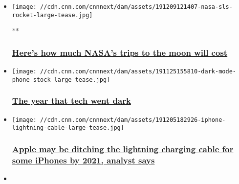 \begin{itemize}
\item
  \href{/videos/business/2019/12/09/nasa-jim-bridenstine-artemis-orig.cnn-business}{}

  \texttt{[image: //cdn.cnn.com/cnnnext/dam/assets/191209121407-nasa-sls-rocket-large-tease.jpg]}

  **

  \hypertarget{heres-how-much-nasas-trips-to-the-moon-will-cost}{%
  \subsubsection{\texorpdfstring{\href{/videos/business/2019/12/09/nasa-jim-bridenstine-artemis-orig.cnn-business}{Here's
  how much NASA's trips to the moon will
  cost}}{Here's how much NASA's trips to the moon will cost}}\label{heres-how-much-nasas-trips-to-the-moon-will-cost}}
\item
  \href{/2019/12/09/tech/dark-mode-design-trend/index.html}{}

  \texttt{[image: //cdn.cnn.com/cnnnext/dam/assets/191125155810-dark-mode-phone--stock-large-tease.jpg]}

  \hypertarget{the-year-that-tech-went-dark}{%
  \subsubsection{\texorpdfstring{\href{/2019/12/09/tech/dark-mode-design-trend/index.html}{The
  year that tech went
  dark}}{The year that tech went dark}}\label{the-year-that-tech-went-dark}}
\item
  \href{/2019/12/08/tech/apple-iphone-lightning-cable/index.html}{}

  \texttt{[image: //cdn.cnn.com/cnnnext/dam/assets/191205182926-iphone-lightning-cable-large-tease.jpg]}

  \hypertarget{apple-may-be-ditching-the-lightning-charging-cable-for-some-iphones-by-2021-analyst-says}{%
  \subsubsection{\texorpdfstring{\href{/2019/12/08/tech/apple-iphone-lightning-cable/index.html}{Apple
  may be ditching the lightning charging cable for some iPhones by 2021,
  analyst
  says}}{Apple may be ditching the lightning charging cable for some iPhones by 2021, analyst says}}\label{apple-may-be-ditching-the-lightning-charging-cable-for-some-iphones-by-2021-analyst-says}}
\item
  \href{/videos/business/2019/12/06/no-cimon-2-ai-robot-emotions-orig.cnn}{}


\end{itemize}
